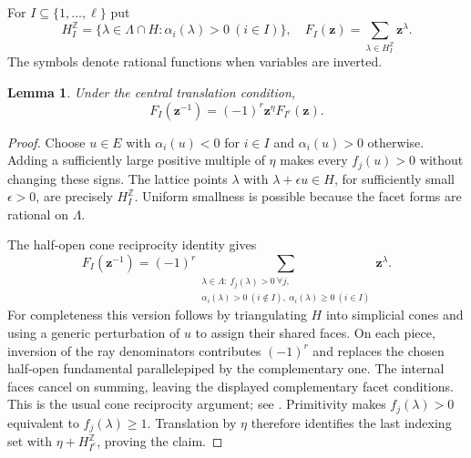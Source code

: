 \documentclass[11pt,a4paper]{article}
\newtheorem{lemma}[proposition]{Lemma}
\theoremstyle{definition}
\newcommand{\Z}{\mathbb Z}
\begin{document}
For $I\subseteq\{1,\ldots,\ell\}$ put
\[
 H_I^{\Z}=\{\lambda\in\Lambda\cap H:
                         \alpha_i(\lambda)>0\ (i\in I)\},\quad
 F_I(\mathbf z)=\sum_{\lambda\in H_I^{\Z}}\mathbf z^\lambda.
\]
The symbols denote rational functions when variables are inverted.
\begin{lemma}\label{lem:reciprocity}
Under the central translation condition,
\begin{equation}\label{eq:reciprocity}
 F_I(\mathbf z^{-1})=(-1)^r\mathbf z^\eta F_{I^c}(\mathbf z).
\end{equation}
\end{lemma}
\begin{proof}
Choose $u\in E$ with $\alpha_i(u)<0$ for $i\in I$ and
$\alpha_i(u)>0$ otherwise. Adding a sufficiently large positive
multiple of $\eta$ makes every $f_j(u)>0$ without changing these
signs. The lattice points $\lambda$ with
$\lambda+\epsilon u\in H$, for sufficiently small $\epsilon>0$,
are precisely $H_I^{\Z}$. Uniform smallness is possible because the
facet forms are rational on $\Lambda$.

The half-open cone reciprocity identity gives
\[
 F_I(\mathbf z^{-1})=(-1)^r
 \sum_{\substack{\lambda\in\Lambda:\ f_j(\lambda)>0\ \forall j,\\
                \alpha_i(\lambda)>0\ (i\notin I),\
                \alpha_i(\lambda)\geq0\ (i\in I)}}\mathbf z^\lambda.
\]
For completeness this version follows by triangulating $H$ into
simplicial cones and using a generic perturbation of $u$ to assign
their shared faces. On each piece, inversion of the ray denominators
contributes $(-1)^r$ and replaces the chosen half-open fundamental
parallelepiped by the complementary one. The internal faces cancel
on summing, leaving the displayed complementary facet conditions.
This is the usual cone reciprocity argument; see \cite{Stanley,BeckSottile}.
Primitivity makes $f_j(\lambda)>0$ equivalent to
$f_j(\lambda)\geq1$. Translation by $\eta$ therefore identifies
the last indexing set with $\eta+H_{I^c}^{\Z}$, proving the claim.
\end{proof}
\end{document}
